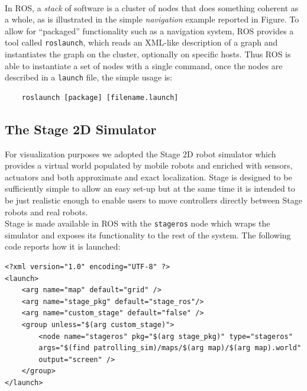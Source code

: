 \\
In ROS, a \textit{stack} of software is a cluster of nodes that does something
coherent as a whole, as is illustrated in the simple \textit{navigation} example reported
in Figure. %
To allow for “packaged” functionality such as a navigation system, ROS provides
a tool called \texttt{roslaunch}, which reads an XML-like description of a graph and instantiates
the graph on the cluster, optionally on specific hosts.
Thus ROS is able to instantiate a set of nodes with a single
command, once the nodes are described in a \texttt{launch} file, the simple usage
is:
\begin{lstlisting}
    roslaunch [package] [filename.launch]
\end{lstlisting}

\subsection{The Stage 2D Simulator}
For visualization purposes we adopted the Stage 2D robot simulator
which provides a virtual world populated by mobile robots and enriched with
sensors, actuators and both approximate and exact localization. Stage is
designed to be sufficiently simple to allow an easy set-up but at the same time
it is intended to be just realistic enough to enable users to move controllers
directly between Stage robots and real robots. 
\\
Stage is made available in ROS with the \texttt{stageros} node which wraps the 
simulator and exposes its functionality to the rest of the system. The following 
code reports how it is launched:

\begin{lstlisting}
<?xml version="1.0" encoding="UTF-8" ?>
<launch>
    <arg name="map" default="grid" />
    <arg name="stage_pkg" default="stage_ros"/>     
    <arg name="custom_stage" default="false" />
    <group unless="$(arg custom_stage)"> 
        <node name="stageros" pkg="$(arg stage_pkg)" type="stageros" 
        args="$(find patrolling_sim)/maps/$(arg map)/$(arg map).world" 
        output="screen" />
    </group>
</launch>
\end{lstlisting}

